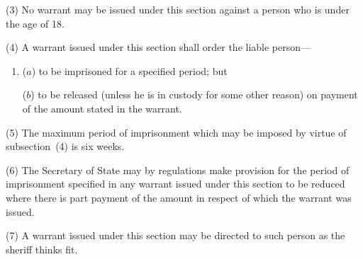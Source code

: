 \documentclass[12pt,a4paper]{article}
\begin{document}
(3) No warrant may be issued under this section against a person who is under the age of 18. 

(4) A warrant issued under this section shall order the liable person—
\begin{enumerate}\item[]
($a$) to be imprisoned for a specified period; but

($b$) to be released (unless he is in custody for some other reason) on payment of the amount stated in the warrant.
\end{enumerate}

(5) The maximum period of imprisonment which may be imposed by virtue of subsection~(4)  is six weeks.

(6) The Secretary of State may by regulations make provision for the period of imprisonment specified in any warrant issued under this section to be reduced where there is part payment of the amount in respect of which the warrant was issued.

(7) A warrant issued under this section may be directed to such person as the sheriff thinks fit.

%
%
%
%
\end{document}
